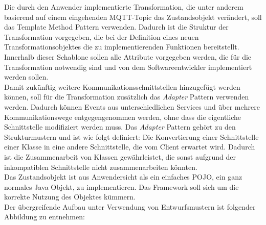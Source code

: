         \linebreak
        Die durch den Anwender implementierte Transformation, die unter anderem basierend auf einem eingehenden \acs{MQTT}-Topic das Zustandsobjekt verändert, soll %
        das {Template Method} Pattern verwenden. Dadurch ist die Struktur der Transformation vorgegeben, die bei der Definition eines neuen Transformationsobjektes die zu 
        implementierenden Funktionen bereitstellt. %
        Innerhalb dieser Schablone sollen alle Attribute vorgegeben werden, die für die Transformation notwendig sind und von dem Softwareentwickler implementiert werden sollen. 
        \\
        \linebreak
        Damit zukünftig weitere Kommunikationsschnittstellen hinzugefügt werden können, soll für die Transformation zusätzlich das 
        \textit{Adapter} Pattern verwenden werden. Dadurch können Events aus unterschiedlichen Services und über mehrere Kommunikationswege 
        entgegengenommen werden, ohne dass die eigentliche Schnittstelle modifiziert werden muss. Das \textit{Adapter} Pattern gehört 
        zu den Strukturmustern und ist wie folgt definiert: 
        Die Konvertierung einer Schnittstelle einer Klasse in eine andere Schnittstelle, die vom Client erwartet wird. Dadurch ist die Zusammenarbeit von Klassen 
        gewährleistet, die sonst aufgrund der inkompatiblen Schnittstelle nicht zusammenarbeiten könnten. \cite{gamma1995adapter}
        \pagebreak
        \\
        Das Zustandsobjekt ist aus Anwendersicht als ein einfaches \ac{POJO}, ein ganz normales Java Objekt, zu implementieren. Das Framework soll sich um die korrekte Nutzung 
        des Objektes kümmern. 
        \\
        \linebreak
        Der übergreifende Aufbau unter Verwendung von Entwurfsmustern ist folgender Abbildung zu entnehmen:
